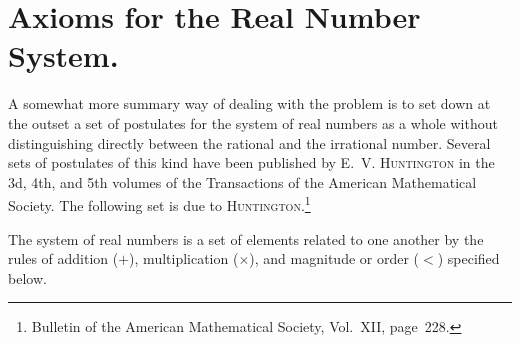 \documentclass[a4paper,12pt]{book}[2004/02/16]
\providecommand{\hypertarget}[2]{#2}
\theoremstyle{ilemma}
\theoremstyle{itheorem}
\theoremstyle{iother}
\theoremstyle{icorollary}
\theoremstyle{numcorollary}
\theoremstyle{idefinition}
\begin{document}
\section{Axioms for the Real Number System.}\hypertarget{chIsec5}{}%
A somewhat more summary way of dealing with the problem is to set down
at the outset a set of postulates for the system of real numbers as a
whole without distinguishing directly between the rational and the
irrational number. Several sets of postulates of this kind have been
published by \textsc{E.~V.  Huntington} in the 3d, 4th, and 5th
volumes of the Transactions of the American Mathematical Society. The
following set is due to \textsc{Huntington}.\footnote{%
    Bulletin of the American Mathematical Society,
    Vol.~XII, page~228.}

The system of real numbers is a set of elements related to one another
by the rules of addition ($+$), multiplication ($\times$), and
magnitude or order ($<$) specified below.
\end{document}
